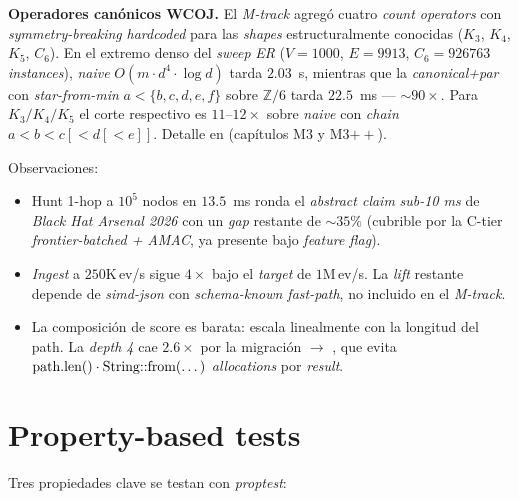 \textbf{Operadores canónicos WCOJ.} El \emph{M-track} agregó cuatro
\emph{count operators} con \emph{symmetry-breaking} \emph{hardcoded}
para las \emph{shapes} estructuralmente conocidas (\(K_3\), \(K_4\),
\(K_5\), \(C_6\)). En el extremo denso del \emph{sweep} \emph{ER}
(\(V=1000\), \(E=9913\), $C_6=926763$ \emph{instances}), \emph{naive}
\(O(m \cdot d^4 \cdot \log d)\) tarda \(2.03\)~s, mientras que la
\emph{canonical+par} con \emph{star-from-min} \(a < \{b,c,d,e,f\}\)
sobre \(\mathbb{Z}/6\) tarda $22.5$~ms --- \(\sim 90\times\). Para
\(K_3/K_4/K_5\) el corte respectivo es \(11\text{--}12\times\) sobre
\emph{naive} con \emph{chain} \(a < b < c[<d[<e]]\). Detalle en
 (capítulos
M3 y M3$++$).

Observaciones:

\begin{itemize}
    \item Hunt 1-hop a $10^5$ nodos en \(13.5\)~ms ronda el
    \emph{abstract claim} \emph{sub-10 ms} de \emph{Black Hat
    Arsenal 2026} con un \emph{gap} restante de \(\sim 35\%\)
    (cubrible por la C-tier \emph{frontier-batched + AMAC}, ya
    presente bajo \emph{feature flag}).
    \item \emph{Ingest} a $250$K\,ev/s sigue $4\times$ bajo el
    \emph{target} de $1$M\,ev/s. La \emph{lift} restante depende
    de \emph{simd-json} con \emph{schema-known fast-path},
    no incluido en el \emph{M-track}.
    \item La composición de score es barata: escala linealmente
    con la longitud del path. La \emph{depth 4} cae $2.6\times$
    por la migración  \(\to\)
    , que evita
    \(\text{path.len()} \cdot \text{String::from(\dots)}\)
    \emph{allocations} por \emph{result}.
\end{itemize}

\section{Property-based tests}

Tres propiedades clave se testan con
\emph{proptest}:

